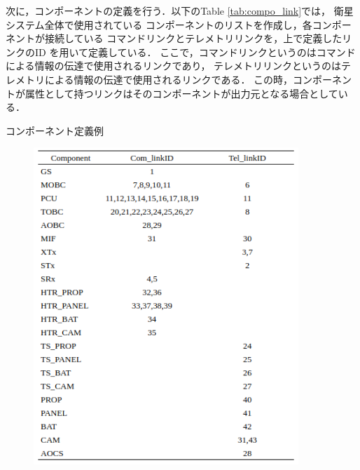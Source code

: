 \documentclass[11pt]{jsreport}
\begin{document}
次に，コンポーネントの定義を行う．以下のTable \ref{tab:compo_link}では，
衛星システム全体で使用されている
コンポーネントのリストを作成し，各コンポーネントが接続している
コマンドリンクとテレメトリリンクを，上で定義したリンクのID
を用いて定義している．
ここで，コマンドリンクというのはコマンドによる情報の伝達で使用されるリンクであり，
テレメトリリンクというのはテレメトリによる情報の伝達で使用されるリンクである．
この時，コンポーネントが属性として持つリンクはそのコンポーネントが出力元となる場合としている．

\newpage
\begin{table}[H]
   \centering
   \caption{コンポーネント定義例}
   \label{tab:compo_link}
\end{table}
\vspace{-2zh}
\begin{figure}[H]
   \centering
      \includegraphics[width=10cm]{figure/compo_link.png}
\end{figure}
\end{document}
